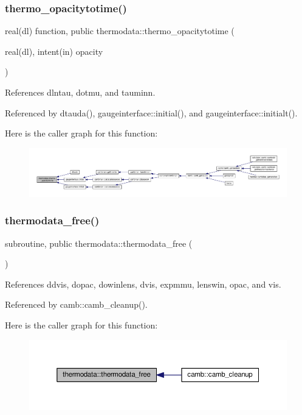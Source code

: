 \subsubsection{\texorpdfstring{thermo\+\_\+opacitytotime()}{thermo\_opacitytotime()}}
{\footnotesize\ttfamily real(dl) function, public thermodata\+::thermo\+\_\+opacitytotime (\begin{DoxyParamCaption}\item[{real(dl), intent(in)}]{opacity }\end{DoxyParamCaption})}



References dlntau, dotmu, and tauminn.



Referenced by dtauda(), gaugeinterface\+::initial(), and gaugeinterface\+::initialt().

Here is the caller graph for this function\+:
\nopagebreak
\begin{figure}[H]
\begin{center}
\leavevmode
\includegraphics[width=350pt]{namespacethermodata_ac4c3a9846b711f25cba7ce38322ee66b_icgraph}
\end{center}
\end{figure}
\mbox{\label{namespacethermodata_a29f627a601dcc5afc90dc9ea8e4d902a}} 
\subsubsection{\texorpdfstring{thermodata\+\_\+free()}{thermodata\_free()}}
{\footnotesize\ttfamily subroutine, public thermodata\+::thermodata\+\_\+free (\begin{DoxyParamCaption}{ }\end{DoxyParamCaption})}



References ddvis, dopac, dowinlens, dvis, expmmu, lenswin, opac, and vis.



Referenced by camb\+::camb\+\_\+cleanup().

Here is the caller graph for this function\+:
\nopagebreak
\begin{figure}[H]
\begin{center}
\leavevmode
\includegraphics[width=350pt]{namespacethermodata_a29f627a601dcc5afc90dc9ea8e4d902a_icgraph}
\end{center}
\end{figure}


